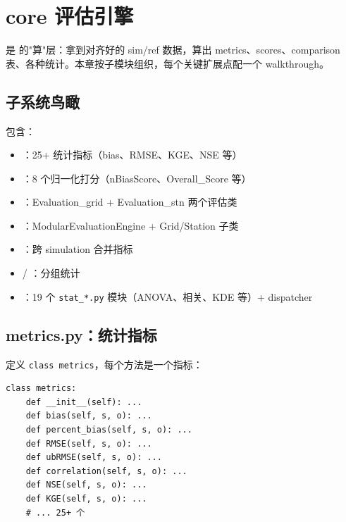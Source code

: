 
\chapter{core 评估引擎}

 是 \openbench{} 的"算"层：拿到对齐好的 sim/ref 数据，算出 metrics、scores、comparison 表、各种统计。本章按子模块组织，每个关键扩展点配一个 walkthrough。

\section{子系统鸟瞰}

 包含：

\begin{itemize}
  \item {}：25+ 统计指标（bias、RMSE、KGE、NSE 等）
  \item {}：8 个归一化打分（nBiasScore、Overall\_Score 等）
  \item {}：Evaluation\_grid + Evaluation\_stn 两个评估类
  \item {}：ModularEvaluationEngine + Grid/Station 子类
  \item {}：跨 simulation 合并指标
  \item {} / ：分组统计
  \item {}：19 个 \texttt{stat\_*.py} 模块（ANOVA、相关、KDE 等）+  dispatcher
\end{itemize}

\section{metrics.py：统计指标}

 定义 \texttt{class metrics}，每个方法是一个指标：

\begin{verbatim}
class metrics:
    def __init__(self): ...
    def bias(self, s, o): ...
    def percent_bias(self, s, o): ...
    def RMSE(self, s, o): ...
    def ubRMSE(self, s, o): ...
    def correlation(self, s, o): ...
    def NSE(self, s, o): ...
    def KGE(self, s, o): ...
    # ... 25+ 个
\end{verbatim}


